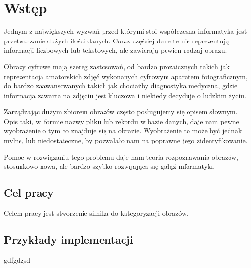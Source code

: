 \chapter*{Wstęp}

Jednym z największych wyzwań przed którymi stoi współczesna informatyka jest przetwarzanie dużych ilości danych. Coraz częściej dane te nie reprezentują informacji liczbowych lub tekstowych, ale zawierają pewien rodzaj obrazu. 

Obrazy cyfrowe mają szereg zastosowań, od bardzo prozaicznych takich jak reprezentacja amatorskich zdjęć wykonanych cyfrowym aparatem fotograficznym, do bardzo zaawansowanych takich jak chociażby diagnostyka medyczna, gdzie informacja zawarta na zdjęciu jest kluczowa i niekiedy decyduje o ludzkim życiu.

Zarządzając dużym zbiorem obrazów często posługujemy się opisem słownym. Opis taki, w~formie nazwy pliku lub rekordu w bazie danych, daje nam pewne wyobrażenie o tym co znajduje się na obrazie. Wyobrażenie to może być jednak mylne, lub niedostateczne, by pozwalało nam na poprawne jego zidentyfikowanie.

Pomoc w rozwiązaniu tego problemu daje nam teoria rozpoznawania obrazów, stosunkowo nowa, ale bardzo szybko rozwijająca się gałąź informatyki. 

\section*{Cel pracy}
Celem pracy jest stworzenie silnika do kategoryzacji obrazów.

\section*{Przykłady implementacji}
gdfgdgsd